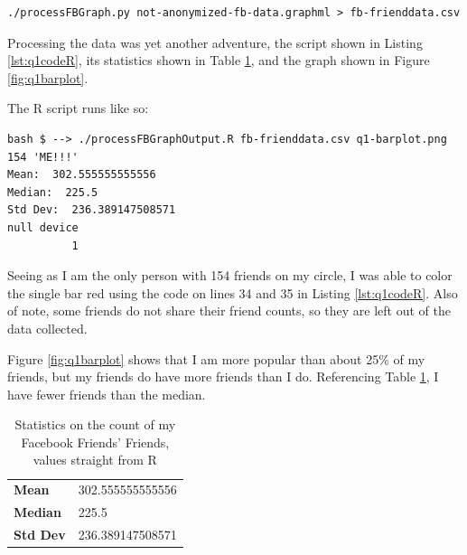 \documentclass[letterpaper,11pt]{article}
\begin{document}
\begin{lstlisting}[frame=single]
./processFBGraph.py not-anonymized-fb-data.graphml > fb-frienddata.csv
\end{lstlisting}

Processing the data was yet another adventure, the script shown in Listing \ref{lst:q1codeR}, its statistics shown in Table \ref{tab:q1stats}, and the graph shown in Figure \ref{fig:q1barplot}.

The R script runs like so:
\begin{lstlisting}[frame=single]
bash $ --> ./processFBGraphOutput.R fb-frienddata.csv q1-barplot.png 154 'ME!!!'
Mean:  302.555555555556
Median:  225.5
Std Dev:  236.389147508571
null device 
          1 
\end{lstlisting}

Seeing as I am the only person with 154 friends on my circle, I was able to color the single bar red using the code on lines 34 and 35 in Listing \ref{lst:q1codeR}.  Also of note, some friends do not share their friend counts, so they are left out of the data collected.

Figure \ref{fig:q1barplot} shows that I am more popular than about 25\% of my friends, but my friends do have more friends than I do.  Referencing Table \ref{tab:q1stats}, I have fewer friends than the median.

\begin{table}
\begin{tabular}{ l l }
\hline
\textbf{Mean} & 302.555555555556 \\
\textbf{Median} & 225.5 \\
\textbf{Std Dev} & 236.389147508571 \\
\hline
\end{tabular}
\caption{Statistics on the count of my Facebook Friends' Friends, values straight from R}
\label{tab:q1stats}
\end{table}
\end{document}
